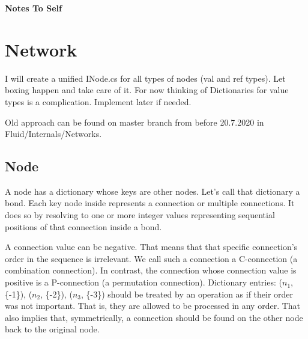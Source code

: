 

\cfoot{\thepage}								      %
\renewcommand{\headrulewidth}{0.0cm}			%
\renewcommand{\footrulewidth}{0.0cm}			%
\lstset{language=bash,basicstyle=\small\sffamily}



\begin{center}
   \textbf{\LARGE{Notes To Self}}\\[0.5cm]
\end{center}

\section{Network}
I will create a unified INode.cs for all types of nodes (val and ref types). Let boxing happen and take care of it. For now thinking of Dictionaries for value types is a complication. Implement later if needed.

Old approach can be found on master branch from before 20.7.2020 in Fluid/Internals/Networks.

\subsection{Node}
A node has a dictionary whose keys are other nodes. Let's call that dictionary a bond. Each key node inside represents a connection or multiple connections. It does so by resolving to one or more integer values representing sequential positions of that connection inside a bond.

A connection value can be negative. That means that that specific connection's order in the sequence is irrelevant. We call such a connection a C-connection (a combination connection). In contrast, the connection whose connection value is positive is a P-connection (a permutation connection). Dictionary entries: ($n_1$, \{-1\}), ($n_2$, \{-2\}), ($n_3$, \{-3\}) should be treated by an operation as if their order was not important. That is, they are allowed to be processed in any order. That also implies that, symmetrically, a connection should be found on the other node back to the original node.



